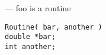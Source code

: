 \startmanpage
{}
--- foo is a routine  
\startvb\begin{verbatim}
Routine( bar, another )
double *bar;
int another;
\end{verbatim}
\endvb

\par
{}
\endmanpage
